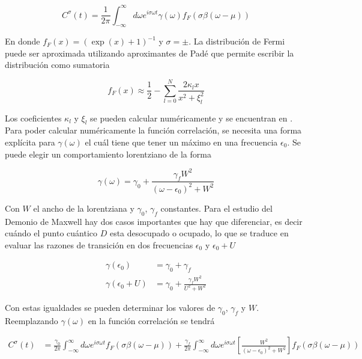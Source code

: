 \begin{appendixs}
\begin{equation*}
    C^{\sigma}(t) = \frac{1}{2\pi} \int_{-\infty}^{\infty} d\omega e^{i\sigma \omega t} \gamma(\omega) f_{F}(\sigma \beta(\omega-\mu))
\end{equation*}

En donde $f_{F}(x) = (\exp(x)+1)^{-1}$ y $\sigma = \pm$. La distribución de Fermi puede ser aproximada utilizando aproximantes de Padé \cite{hu2011pade,schinabeck2019hierarchical} que permite escribir la distribución como sumatoria

\begin{equation}
    f_{F}(x) \approx \frac{1}{2} - \sum_{l=0}^{N} \frac{ 2 \kappa_{l}x }{ x^{2} + \xi^{2}_{l} }
    \label{apendix5:pade}
\end{equation}

Los coeficientes $\kappa_{l}$ y $\xi_{l}$ se pueden calcular numéricamente y se encuentran en \cite{hu2011pade}. Para poder calcular numéricamente la función correlación, se necesita una forma explícita para $\gamma(\omega)$ el cuál tiene que tener un máximo en una frecuencia $\epsilon_{0}$. Se puede elegir un comportamiento lorentziano de la forma

\begin{equation*}
    \gamma(\omega) = \gamma_{0} + \frac{\gamma_{f} W^{2}}{(\omega - \epsilon_{0})^{2} + W^{2}}
\end{equation*}

Con $W$ el ancho de la lorentziana y $\gamma_{0}$, $\gamma_{f}$ constantes. Para el estudio del Demonio de Maxwell hay dos casos importantes que hay que diferenciar, es decir cuándo el punto cuántico $D$ esta desocupado o ocupado, lo que se traduce en evaluar las razones de transición en dos frecuencias $\epsilon_{0}$ y $\epsilon_{0}+U$

\begin{align*}
    \gamma(\epsilon_{0}) & = \gamma_{0} + \gamma_{f} \\
    \gamma(\epsilon_{0} + U) & = \gamma_{0} + \frac{\gamma_{f} W^{2} }{U^{2} + W^{2}}
\end{align*}

Con estas igualdades se pueden determinar los valores de $\gamma_{0}$, $\gamma_{f}$ y $W$. Reemplazando $\gamma(\omega)$ en la función correlación se tendrá

\begin{align*}
    C^{\sigma}(t) & = \frac{\gamma_{0}}{2\pi} \int_{-\infty}^{\infty}d\omega e^{i\sigma \omega t} f_{F}(\sigma \beta (\omega-\mu)) + \frac{\gamma_{f}}{2\pi} \int_{-\infty}^{\infty}d\omega e^{i\sigma \omega t}\left[ \frac{W^{2}}{(\omega-\epsilon_{0})^{2} + W^{2}} \right] f_{F}(\sigma \beta (\omega-\mu))
\end{align*}


\end{appendixs}
